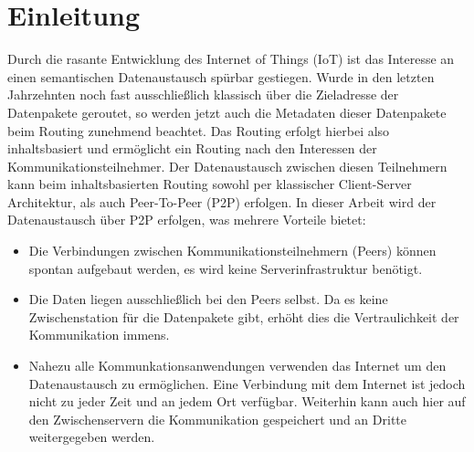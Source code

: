 


\section{Einleitung}
Durch die rasante Entwicklung des Internet of Things (IoT) ist das Interesse an einen semantischen Datenaustausch spürbar gestiegen. Wurde in den letzten Jahrzehnten noch fast ausschließlich klassisch über die Zieladresse der Datenpakete geroutet, so werden jetzt auch die Metadaten dieser Datenpakete beim Routing zunehmend beachtet. Das Routing erfolgt hierbei also inhaltsbasiert und ermöglicht ein Routing nach den Interessen der Kommunikationsteilnehmer. Der Datenaustausch zwischen diesen Teilnehmern kann beim inhaltsbasierten Routing sowohl per klassischer Client-Server Architektur, als auch Peer-To-Peer (P2P) erfolgen. In dieser Arbeit wird der Datenaustausch über P2P erfolgen, was mehrere Vorteile bietet:
\begin{itemize}
\item Die Verbindungen zwischen Kommunikationsteilnehmern (Peers) können spontan aufgebaut werden, es wird keine Serverinfrastruktur benötigt.
\item Die Daten liegen ausschließlich bei den Peers selbst. Da es keine Zwischenstation für die Datenpakete gibt, erhöht dies die Vertraulichkeit der Kommunikation immens. 
\item Nahezu alle Kommunkationsanwendungen verwenden das Internet um den Datenaustausch zu ermöglichen. Eine Verbindung mit dem Internet ist jedoch nicht zu jeder Zeit und an jedem Ort verfügbar. Weiterhin kann auch hier auf den Zwischenservern die Kommunikation gespeichert und an Dritte weitergegeben werden.
\end{itemize}  


